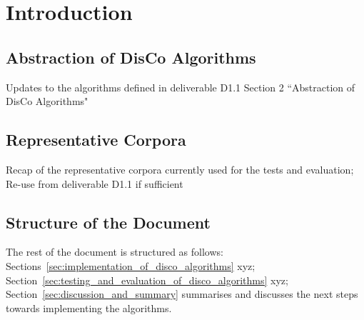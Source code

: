 \section{Introduction}
\label{sec:introduction}

\subsection{Abstraction of DisCo Algorithms}
\label{sec:abstraction_of_disco_algorithms}
Updates to the algorithms defined in deliverable D1.1 Section 2 ``Abstraction of DisCo Algorithms"

\subsection{Representative Corpora}
\label{sec:representative_corpora}
Recap of the representative corpora currently used for the tests and evaluation; Re-use from deliverable D1.1 if sufficient

\subsection{Structure of the Document}
The rest of the document is structured as follows: Sections~\ref{sec:implementation_of_disco_algorithms} xyz; Section~\ref{sec:testing_and_evaluation_of_disco_algorithms} xyz; Section~\ref{sec:discussion_and_summary} summarises and discusses the next steps towards implementing the algorithms.
